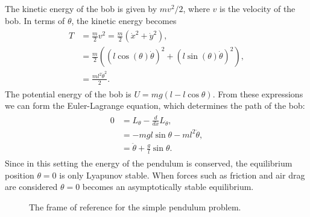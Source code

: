 The kinetic energy of the bob is given by $mv^2/2$, where $v$ is the velocity of the bob. 
In terms of $\theta$, the kinetic energy becomes 
\begin{align}
	\begin{split}
	T &= \frac{m}{2}v^2  = \frac{m}{2}(\dot{x}^2 + \dot{y}^2),\\
	&= \frac{m}{2}((l\cos(\theta)\dot{\theta})^2 + (l\sin(\theta)\dot{\theta})^2),\\
	&= \frac{ml^2\dot{\theta}^2}{2}.
	\end{split}
\end{align}
The potential energy of the bob is $U = mg(l-l\cos \theta)$. 
From these expressions we can form the Euler-Lagrange equation, which determines the path of the bob: 
\begin{align}
	\begin{split}
	0 &= L_{\theta} - \frac{d}{dx}L_{\dot{\theta}},\\
	&= -mgl\sin \theta - m l^2 \ddot{\theta},\\
	&= \ddot{\theta} + \frac{g}{l}\sin \theta.
	\end{split}
\end{align}
Since in this setting the energy of the pendulum is conserved, the equilibrium position $\theta = 0$ is only Lyapunov stable. When forces such as friction and air drag are considered $\theta = 0$ becomes an asymptotically stable equilibrium. 


\begin{figure}
\begin{center}
\end{center}
\caption{The frame of reference for the simple pendulum problem.}
\label{fig:inverted_pendulum:simple_gravity_pendulum}
\end{figure}

